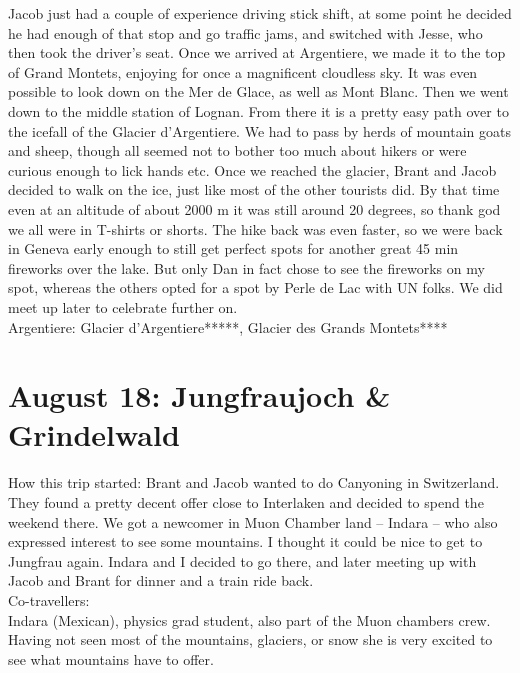 Jacob just had a couple of experience driving stick shift, at some point he decided he had enough of that stop and go traffic jams, and switched with Jesse, who then took the driver's seat. Once we arrived at Argentiere, we made it to the top of Grand Montets, enjoying for once a magnificent cloudless sky. It was even possible to look down on the Mer de Glace, as well as Mont Blanc. Then we went down to the middle station of Lognan. From there it is a pretty easy path over to the icefall of the Glacier d'Argentiere. We had to pass by herds of mountain goats and sheep, though all seemed not to bother too much about hikers or were curious enough to lick hands etc. Once we reached the glacier, Brant and Jacob decided to walk on the ice, just like most of the other tourists did. By that time even at an altitude of about 2000 m it was still around 20 degrees, so thank god we all were in T-shirts or shorts. The hike back was even faster, so we were back in Geneva early enough to still get perfect spots for another great 45 min fireworks over the lake. But only Dan in fact chose to see the fireworks on my spot, whereas the others opted for a spot by Perle de Lac with UN folks. We did meet up later to celebrate further on.\\

Argentiere: Glacier d'Argentiere*****, Glacier des Grands Montets****

\section{August 18: Jungfraujoch \& Grindelwald}
\label{Jsungfrau2012}

How this trip started: Brant and Jacob wanted to do Canyoning in Switzerland. They found a pretty decent offer close to Interlaken and decided to spend the weekend there. We got a newcomer in Muon Chamber land -- Indara -- who also expressed interest to see some mountains. I thought it could be nice to get to Jungfrau again. Indara and I decided to go there, and later meeting up with Jacob and Brant for dinner and a train ride back.\\

Co-travellers:\\
Indara (Mexican), physics grad student, also part of the Muon chambers crew. Having not seen most of the mountains, glaciers, or snow she is very excited to see what mountains have to offer.\\

